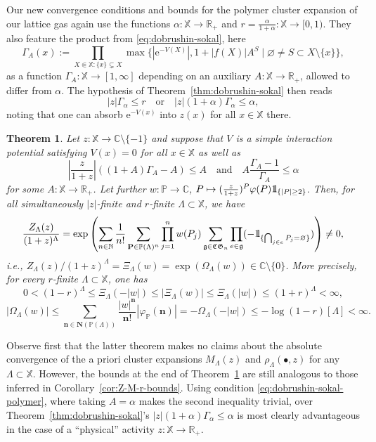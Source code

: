 \documentclass[reqno, 11pt]{amsart}
\newtheorem{theorem}{Theorem}[section]
\theoremstyle{definition}
\newcommand{\e}{\mathrm{e}}
\newcommand{\N}{\mathbb{N}}
\newcommand{\R}{\mathbb{R}}
\newcommand{\C}{\mathbb{C}}
\renewcommand{\P}{\mathbb{P}}
\newcommand{\X}{\mathbb X}
\newcommand{\be}{\begin{equation}}
\newcommand{\ee}{\end{equation}}
\def\1{{\mathchoice {1\mskip-4mu\mathrm l}      
{1\mskip-4mu\mathrm l}
{1\mskip-4.5mu\mathrm l} {1\mskip-5mu\mathrm l}}}
\begin{document}
Our new convergence conditions and bounds for the polymer cluster expansion of our lattice gas again use the functions $\alpha : \X \to \R_+$ and $r = \frac{\alpha}{1+\alpha} : \X \to [0,1)$. 
They also feature the product from \eqref{eq:dobrushin-sokal}, here
\[
	\Gamma_A(x) := \prod_{X\Subset\X : \{x\} \subsetneq X} \max\{|\e^{-V(X)}|, 1 + |f(X)| A^S \mid \varnothing \neq S \subset X \setminus \{x\}\},
\]
as a function $\Gamma_A : \X \to [1,\infty]$ depending on an auxiliary $A : \X \to \R_+$, allowed to differ from $\alpha$. 
The hypothesis of Theorem~\ref{thm:dobrushin-sokal} then reads
\[
	|z| \Gamma_\alpha \leq r \quad \text{or} \quad |z| (1+\alpha) \Gamma_\alpha \leq \alpha,
\]
noting that one can absorb $\e^{-V(x)}$ into $z(x)$ for all $x \in \X$ there.

\begin{theorem} \label{thm:dobrushin-sokal-polymer}
	Let $z : \X \to \C \setminus \{-1\}$ and suppose that $V$ is a simple interaction potential satisfying $V(x) = 0$ for all $x \in \X$ as well as
	\be \label{eq:dobrushin-sokal-polymer}
		|{\textstyle \frac{z}{1+z}}| ((1+A)\Gamma_A - A) \leq A \quad \text{and} \quad A {\textstyle \frac{\Gamma_A - 1}{\Gamma_A}} \leq \alpha
	\ee
	for some $A : \X \to \R_+$. 
	Let further $w : \P \to \C$, $P \mapsto (\frac{z}{1+z})^P \varphi(P) \1_{\{|P|\geq 2\}}$. 
	Then, for all simultaneously $|z|$-finite and $r$-finite $\Lambda \subset \X$, we have
	\[
		\frac{Z_\Lambda(z)}{(1+z)^\Lambda} = \exp\left( \sum_{n \in \N} \frac{1}{n!} \sum_{\mathbf P \in \P(\Lambda)^n} \prod_{j=1}^n w(P_j) \sum_{\mathfrak g \in \mathfrak{CG}_n} \prod_{e\in\mathfrak g} (-\1_{\{\bigcap_{j\in e} P_j = \varnothing\}}) \right) \neq 0,
	\]
	i.e., $Z_\Lambda(z) / (1+z)^\Lambda = \Xi_\Lambda(w) = \exp(\Omega_\Lambda(w)) \in \C \setminus \{0\}$. 
	More precisely, for every $r$-finite $\Lambda \subset \X$, one has
	\[
		0 < (1-r)^\Lambda \leq \Xi_\Lambda(-|w|) \leq |\Xi_\Lambda(w)| \leq \Xi_\Lambda(|w|) \leq (1+r)^\Lambda < \infty,
	\]
	\[
		|\Omega_\Lambda(w)| \leq \sum_{\mathbf n \in \mathbf N(\P(\Lambda))} \frac{|w|^\mathbf n}{\mathbf n!} |\varphi_\P(\mathbf n)| = -\Omega_\Lambda(-|w|) \leq - \log (1 - r)[\Lambda] < \infty.
	\]
\end{theorem}

Observe first that the latter theorem makes no claims about the absolute convergence of the a priori cluster expansions $M_\Lambda(z)$ and $\rho_\Lambda(\bullet, z)$ for any $\Lambda \subset \X$. 
However, the bounds at the end of Theorem~\ref{thm:dobrushin-sokal-polymer} are still analogous to those inferred in Corollary~\ref{cor:Z-M-r-bounds}.  
Using condition \eqref{eq:dobrushin-sokal-polymer}, where taking $A=\alpha$ makes the second inequality trivial, over Theorem~\ref{thm:dobrushin-sokal}'s $|z| (1+\alpha) \Gamma_\alpha \leq \alpha$ is most clearly advantageous in the case of a ``physical'' activity $z : \X \to \R_+$.
\end{document}

